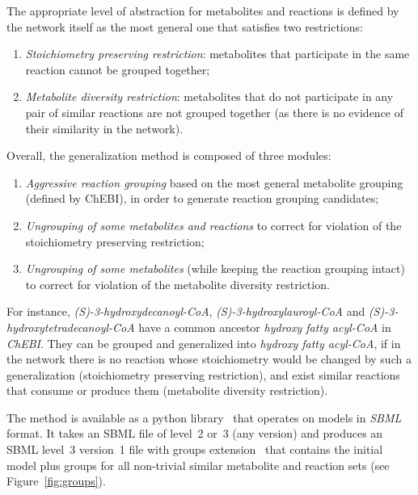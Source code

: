 \documentclass{bmcart}
\begin{document}
The appropriate level of abstraction for metabolites and reactions is defined by the network itself as the most general one that satisfies two restrictions: 
\begin{enumerate}
 \item \emph{Stoichiometry preserving restriction}: metabolites that participate in the same reaction cannot be grouped together;
 \item \emph{Metabolite diversity restriction}: metabolites that do not participate in any pair of similar reactions are not grouped together (as there is no evidence of their similarity in the network).
\end{enumerate}

Overall, the generalization method is composed of three modules: 
\begin{enumerate}
\item \emph{Aggressive reaction grouping} based on the most general metabolite grouping (defined by ChEBI), in order to generate reaction grouping candidates;
\item \emph{Ungrouping of some metabolites and reactions} to correct for violation of the stoichiometry preserving restriction;
\item \emph{Ungrouping of some metabolites} (while keeping the reaction grouping intact) to correct for violation of the metabolite diversity restriction.
\end{enumerate} 

For instance, \textit{(S)-3-hydroxydecanoyl-CoA}, \textit{(S)-3-hydroxylauroyl-CoA} and \textit{(S)-3-hydroxytetradecanoyl-CoA} have a common ancestor \textit{hydroxy fatty acyl-CoA} in \textit{ChEBI}. They can be grouped and generalized into \textit{hydroxy fatty acyl-CoA}, if in the network there is no reaction whose stoichiometry would be changed by such a generalization (stoichiometry preserving restriction), and exist similar reactions that consume or produce them (metabolite diversity restriction).

The method is available as a python library~\cite{Metamogen} that operates on models in \textit{SBML}~\cite{Hucka08} format. It takes an SBML file of level~2 or~3 (any version) and produces an SBML level~3 version~1 file with groups extension~\cite{Hucka2012} that contains the initial model plus groups for all non-trivial similar metabolite and reaction sets (see Figure~\ref{fig:groups}).

\end{document}

